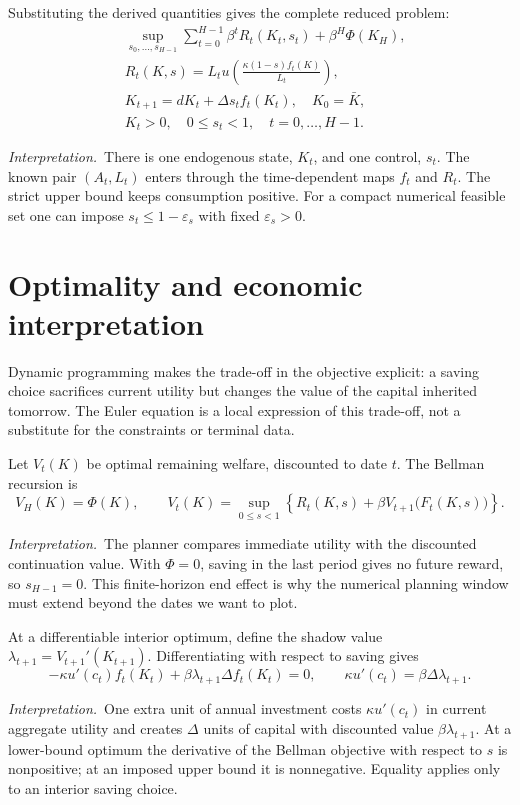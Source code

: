 \documentclass[11pt,a4paper]{article}
\newcommand{\interp}{\par\smallskip\noindent\textit{Interpretation.}\ }
\begin{document}
Substituting the derived quantities gives the complete reduced problem:
\begin{equation}\label{eq:growthproblem}
\boxed{\begin{aligned}
 &\sup_{s_0,\ldots,s_{H-1}}
 \sum_{t=0}^{H-1}\beta^t R_t(K_t,s_t)+\beta^H\Phi(K_H),\\
 &R_t(K,s)=L_tu\!\left(\frac{\kappa(1-s)f_t(K)}{L_t}\right),\\
 &K_{t+1}=dK_t+\Delta s_t f_t(K_t),\quad K_0=\bar K,\\
 &K_t>0,\quad 0\leq s_t<1,\quad t=0,\ldots,H-1 .
\end{aligned}}
\end{equation}
\interp There is one endogenous state, $K_t$, and one control, $s_t$.
The known pair $(A_t,L_t)$ enters through the time-dependent maps $f_t$
and $R_t$. The strict upper bound keeps consumption positive. For a
compact numerical feasible set one can impose $s_t\leq1-\varepsilon_s$
with fixed $\varepsilon_s>0$.

\section{Optimality and economic interpretation}
Dynamic programming makes the trade-off in the objective explicit:
a saving choice sacrifices current utility but changes the value of
the capital inherited tomorrow. The Euler equation is a local expression
of this trade-off, not a substitute for the constraints or terminal data.

Let $V_t(K)$ be optimal remaining welfare, discounted to date $t$.
The Bellman recursion is
\begin{equation}\label{eq:bellman}
 V_H(K)=\Phi(K),\qquad
 V_t(K)=\sup_{0\leq s<1}
 \left\{R_t(K,s)+\beta V_{t+1}\big(F_t(K,s)\big)\right\}.
\end{equation}
\interp The planner compares immediate utility with the discounted
continuation value. With $\Phi=0$, saving in the last period gives no
future reward, so $s_{H-1}=0$. This finite-horizon end effect is why the
numerical planning window must extend beyond the dates we want to plot.

At a differentiable interior optimum, define the shadow value
$\lambda_{t+1}=V_{t+1}'(K_{t+1})$. Differentiating with respect to saving gives
\begin{equation}\label{eq:foc}
 -\kappa u'(c_t)f_t(K_t)
 +\beta\lambda_{t+1}\Delta f_t(K_t)=0,
 \qquad
 \kappa u'(c_t)=\beta\Delta\lambda_{t+1}.
\end{equation}
\interp One extra unit of annual investment costs $\kappa u'(c_t)$
in current aggregate utility and creates $\Delta$ units of capital with
discounted value $\beta\lambda_{t+1}$. At a lower-bound optimum the
derivative of the Bellman objective with respect to $s$ is nonpositive;
at an imposed upper bound it is nonnegative. Equality applies only
to an interior saving choice.
\end{document}
